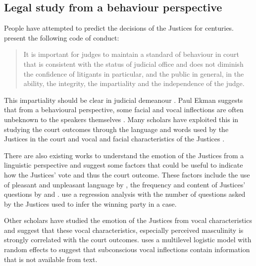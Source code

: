 \documentclass{monashthesis}
\begin{document}
\hypertarget{legal-study-from-a-behaviour-perspective}{%
\subsection{Legal study from a behaviour perspective}\label{legal-study-from-a-behaviour-perspective}}

People have attempted to predict the decisions of the Justices for centuries. \textcite{judicalguid} present the following code of conduct:

\begin{quote}
It is important for judges to maintain a standard of behaviour in court that is consistent with the status of judicial office and does not diminish the confidence of litigants in particular, and the public in general, in the ability, the integrity, the impartiality and the independence of the judge.
\end{quote}

This impartiality should be clear in judicial demeanour \autocites{tutton2018judicial}{goffman1956nature}. Paul Ekman \autocite{ekman1991invited} suggests that from a behavioural perspective, some facial and vocal inflections are often unbeknown to the speakers themselves . Many scholars have exploited this in studying the court outcomes through the language and words used by the Justices in the court \autocite{Shullman2004illusion} and vocal and facial characteristics of the Justices \autocite{chen2018justice}.

There are also existing works to understand the emotion of the Justices from a linguistic perspective and suggest some factors that could be useful to indicate how the Justices' vote and thus the court outcome. These factors include the use of pleasant and unpleasant language by \textcite{black2011emotions}, the frequency and content of Justices' questions by \textcite{Shullman2004illusion} and \textcite{johnson2009inquiring}. \textcite{epstein2010inferring} use a regression analysis with the number of questions asked by the Justices used to infer the winning party in a case.

Other scholars \autocites{chen2016perceived}{chen2017covering}{schubert1992observing} have studied the emotion of the Justices from vocal characteristics and suggest that these vocal characteristics, especially perceived masculinity is strongly correlated with the court outcomes. \textcite{dietrich2019emotional} uses a multilevel logistic model with random effects to suggest that subconscious vocal inflections contain information that is not available from text.
\end{document}
